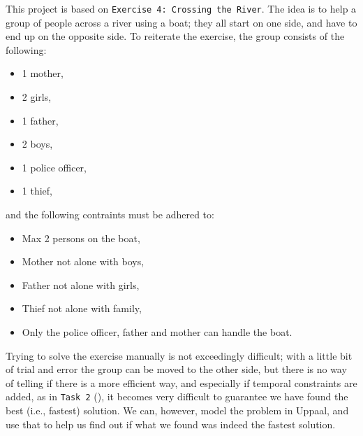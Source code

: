 This project is based on \texttt{Exercise 4: Crossing the River}. The idea is to help a group of people across a river using a boat; they all start on one side, and have to end up on the opposite side. To reiterate the exercise, the group consists of the following:
\begin{itemize}
\setlength\itemsep{.1em}
	\item 1 mother,
	\item 2 girls,
	\item 1 father,
	\item 2 boys,
	\item 1 police officer,
	\item 1 thief,
\end{itemize}

\noindent and the following contraints must be adhered to:

\begin{itemize}
\setlength\itemsep{.1em}
	\item Max 2 persons on the boat,
	\item Mother not alone with boys,
	\item Father not alone with girls,
	\item Thief not alone with family,
	\item Only the police officer, father and mother can handle the boat.
\end{itemize}

\noindent Trying to solve the exercise manually is not exceedingly difficult; with a little bit of trial and error the group can be moved to the other side, but there is no way of telling if there is a more efficient way, and especially if temporal constraints are added, as in \texttt{Task 2} (), it becomes very difficult to guarantee we have found the best (i.e., fastest) solution. We can, however, model the problem in Uppaal, and use that to help us find out if what we found was indeed the fastest solution.